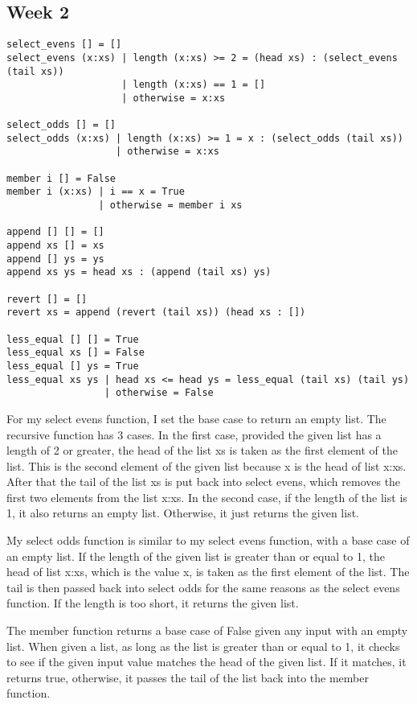 \documentclass{article}
\theoremstyle{theorem}
\theoremstyle{definition}
\theoremstyle{remark}
\begin{document}
\subsection{Week 2}

\begin{lstlisting}
select_evens [] = []
select_evens (x:xs) | length (x:xs) >= 2 = (head xs) : (select_evens (tail xs))
                    | length (x:xs) == 1 = []
                    | otherwise = x:xs

select_odds [] = []
select_odds (x:xs) | length (x:xs) >= 1 = x : (select_odds (tail xs))
                   | otherwise = x:xs

member i [] = False
member i (x:xs) | i == x = True
                | otherwise = member i xs

append [] [] = []
append xs [] = xs
append [] ys = ys
append xs ys = head xs : (append (tail xs) ys)

revert [] = []
revert xs = append (revert (tail xs)) (head xs : [])

less_equal [] [] = True
less_equal xs [] = False
less_equal [] ys = True
less_equal xs ys | head xs <= head ys = less_equal (tail xs) (tail ys)
                 | otherwise = False
\end{lstlisting}
%
For my select evens function, I set the base case to return an empty list. The recursive function has 3 cases. In the first case, provided the given list has a length of 2 or greater, the head of the list xs is taken as the first element of the list. This is the second element of the given list because x is the head of list x:xs. After that the tail of the list xs is put back into select evens, which removes the first two elements from the list x:xs. In the second case, if the length of the list is 1, it also returns an empty list. Otherwise, it just returns the given list.

\medskip\noindent
My select odds function is similar to my select evens function, with a base case of an empty list. If the length of the given list is greater than or equal to 1, the head of list x:xs, which is the value x, is taken as the first element of the list. The tail is then passed back into select odds for the same reasons as the select evens function. If the length is too short, it returns the given list.

\medskip\noindent
The member function returns a base case of False given any input with an empty list. When given a list, as long as the list is greater than or equal to 1, it checks to see if the given input value matches the head of the given list. If it matches, it returns true, otherwise, it passes the tail of the list back into the member function.
\end{document}
